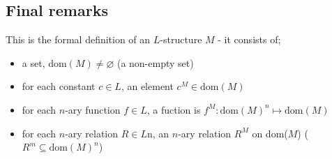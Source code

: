 \documentclass[a4paper, 12pt]{article}
\renewcommand{\emptyset}[0]{\varnothing}
\begin{document}
        \subsection*{Final remarks}
            This is the formal definition of an $L$-structure $M$ - it consists of;
            \begin{itemize}
                \itemsep0em
                \item a set, $\text{dom}(M) \neq \emptyset$ (a non-empty set)
                \item for each constant $c \in L$, an element $c^M \in \text{dom}(M)$
                \item for each $n$-ary function $f \in L$, a fuction is $f^M: \text{dom}(M)^n \mapsto \text{dom}(M)$
                \item for each $n$-ary relation $R \in L$n, an $n$-ary relation $R^M$ on dom($M$) ($R^m \subseteq \text{dom}(M)^n$)
            \end{itemize}
\end{document}
